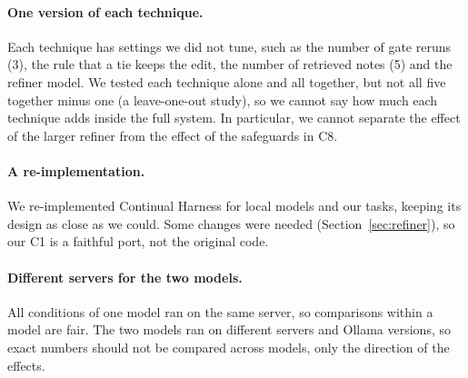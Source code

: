 \paragraph{One version of each technique.}
Each technique has settings we did not tune, such as the number of gate reruns (3), the rule that a
tie keeps the edit, the number of retrieved notes (5) and the refiner model. We tested each
technique alone and all together, but not all five together minus one (a leave-one-out study), so
we cannot say how much each technique adds inside the full system. In particular, we cannot
separate the effect of the larger refiner from the effect of the safeguards in C8.

\paragraph{A re-implementation.}
We re-implemented Continual Harness for local models and our tasks, keeping its design as close as
we could. Some changes were needed (Section~\ref{sec:refiner}), so our C1 is a faithful port, not
the original code.

\paragraph{Different servers for the two models.}
All conditions of one model ran on the same server, so comparisons within a model are fair. The two
models ran on different servers and Ollama versions, so exact numbers should not be compared across
models, only the direction of the effects.
